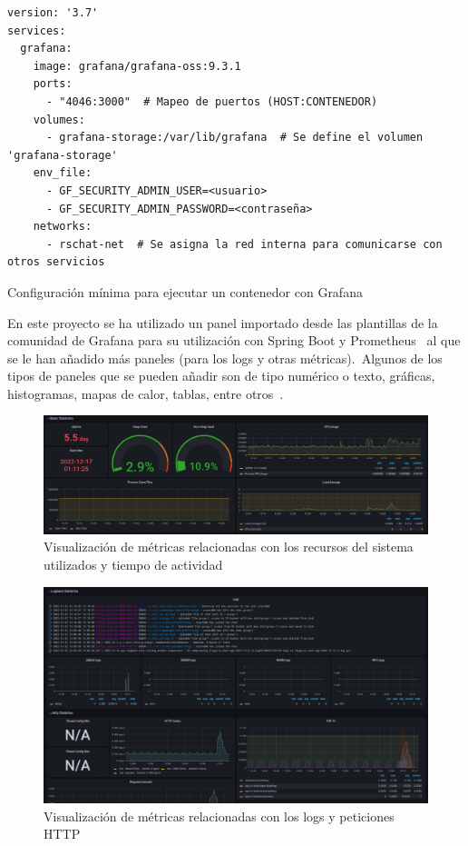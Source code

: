 \begin{codeBlock}
	\begin{verbatim}
version: '3.7'
services:
  grafana:
    image: grafana/grafana-oss:9.3.1
    ports:
      - "4046:3000"  # Mapeo de puertos (HOST:CONTENEDOR)
    volumes:
      - grafana-storage:/var/lib/grafana  # Se define el volumen 'grafana-storage'
    env_file:
      - GF_SECURITY_ADMIN_USER=<usuario>
      - GF_SECURITY_ADMIN_PASSWORD=<contraseña>
    networks:
      - rschat-net  # Se asigna la red interna para comunicarse con otros servicios
	\end{verbatim}
	\caption{Configuración mínima para ejecutar un contenedor con Grafana}
\end{codeBlock}
\label{cod:grafana-docker-compose}

En este proyecto se ha utilizado un panel importado desde las plantillas de la comunidad de Grafana para su utilización
con Spring Boot y Prometheus~\cite{spring-dashboard} al que se le han añadido más paneles (para los logs y otras
métricas).\ Algunos de los tipos de paneles que se pueden añadir son de tipo numérico o texto, gráficas, histogramas,
mapas de calor, tablas, entre otros~\cite{visualizaciones-grafana}.

\begin{figure}[H]
	\centering
	\includegraphics[width=\textwidth]{res/images/GrafanaDashboard_1}
	\caption{Visualización de métricas relacionadas con los recursos del sistema utilizados y tiempo de actividad}
	\label{fig:grafana-dashboard_1}
\end{figure}

\begin{figure}[H]
	\centering
	\includegraphics[width=\textwidth]{res/images/GrafanaDashboard_2}
	\caption{Visualización de métricas relacionadas con los logs y peticiones HTTP}
	\label{fig:grafana-dashboard_2}
\end{figure}

